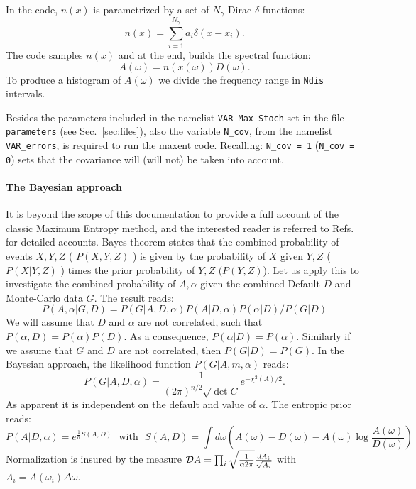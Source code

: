 In the code,  $n(x)$ is parametrized  by a  set of $N_{\gamma}$ Dirac $\delta$ functions: 
\begin{equation}
  \label{eqn:n_parametrization}
      n(x)  = \sum_{i=1}^{N_{\gamma}} a_{i} \delta \left( x - x_i \right).
\end{equation}
The code  samples  $n(x)$ and  at  the  end,  builds  the    spectral  function:
\begin{equation}
       A(\omega) =  n(x(\omega)) D(\omega). 
\end{equation}
To produce a histogram of  $ A(\omega) $ we divide  the frequency range in \texttt{Ndis} intervals. 

Besides the parameters included in the namelist \texttt{VAR\_Max\_Stoch} set in the file \texttt{parameters} 
(see Sec.~\ref{sec:files}), also the variable \texttt{N\_cov}, from the namelist \texttt{VAR\_errors}, is 
required to run the maxent code. Recalling: \texttt{N\_cov = 1} (\texttt{N\_cov = 0}) sets that the covariance will
(will not) be taken into account.

\paragraph*{The Bayesian approach}
It is  beyond  the  scope of  this  documentation to provide a  full  account of the   classic Maximum Entropy method,  and  
the  interested  reader  is  referred  to Refs.~\cite{Jarrell96,Linden95}   for  detailed  accounts. 
Bayes theorem  states  that  the  combined   probability  of   events  $X, Y, Z$   ( $P(X,Y,Z)$ )   is   given  by  the 
probability of   $X$ given $Y, Z$  ($ P(X|Y,Z) $ ) times  the  prior probability of  $Y,Z$   ($P(Y,Z)$).  Let  us  apply  this 
to  investigate  the   combined  probability of  $A,\alpha$ given  the  combined  Default $ D $  and   Monte-Carlo data  $G$.   The  
result  reads: 
\begin{equation}
P(A,\alpha| G, D) = P(G|A,D,\alpha) P(A|D,\alpha) P(\alpha| D  ) / P(G| D )
\end{equation} 
We  will  assume  that  $ D $  and $\alpha$  are  not   correlated,  such  that  $ P(\alpha,D) = P(\alpha) 
P(D) $.   As  a   consequence,  $ P(\alpha|D)   = P(\alpha) $.  Similarly  if  we  assume that 
$G$ and $D$  are not  correlated,  then $P(G| D ) =  P(G) $.     In the Bayesian approach,  the   likelihood   
function  $P(G|A,m,\alpha)$ reads:
\begin{equation}
  P(G|A,D,\alpha)  = \frac{1}{(2\pi)^{n/2} \sqrt{\det C }}   e^{ - \chi^2(A)/2}.
\end{equation} 
As  apparent  it is  independent on   the  default  and   value  of  $\alpha$.    The entropic  prior  reads:
\begin{equation}
    P(A|D,\alpha) =  e^{\frac{1}{\alpha} S(A,D)} \, \, \text{ with } \, \, 
    S(A,D)  = \int d \omega  \left(  A(\omega) -  D(\omega) -  A(\omega) \log \frac{A(\omega)}{D(\omega)} \right)
\end{equation}
Normalization is  insured  by  the  measure ${\cal D} A =  \prod_i \sqrt{\frac{1}{\alpha 2 \pi}} \frac{d A_i}{\sqrt{A_i}}$
with $A_i =  A(\omega_i) \Delta \omega $.

